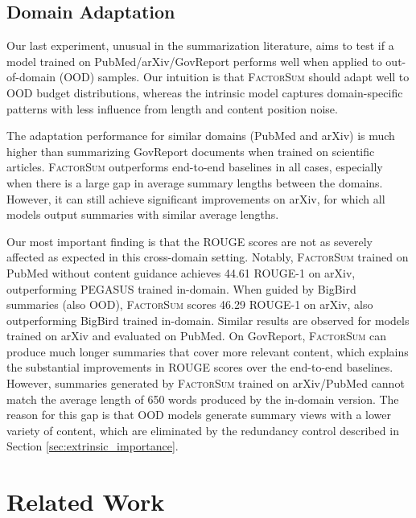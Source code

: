 \documentclass[11pt,table]{article}
\newcommand{\modelname}{FactorSum}
\begin{document}
\subsection{Domain Adaptation}
Our last experiment, unusual in the summarization literature, aims to test if a model trained on PubMed/arXiv/GovReport performs well when applied to out-of-domain (OOD) samples. Our intuition is that \textsc{\modelname} should adapt well to OOD budget distributions, whereas the intrinsic model captures domain-specific patterns with less influence from length and content position noise.

The adaptation performance for similar domains (PubMed and arXiv) is much higher than summarizing GovReport documents when trained on scientific articles. \textsc{\modelname} outperforms end-to-end baselines in all cases, especially when there is a large gap in average summary lengths between the domains. However, it can still achieve significant improvements on arXiv, for which all models output summaries with similar average lengths.

Our most important finding is that the ROUGE scores are not as severely affected as expected in this cross-domain setting. Notably, \textsc{\modelname} trained on PubMed without content guidance achieves 44.61 ROUGE-1 on arXiv, outperforming PEGASUS trained in-domain. When guided by BigBird summaries (also OOD), \textsc{\modelname} scores 46.29 ROUGE-1 on arXiv, also outperforming BigBird trained in-domain. Similar results are observed for models trained on arXiv and evaluated on PubMed.
On GovReport, \textsc{\modelname} can produce much longer summaries that cover more relevant content, which explains the substantial improvements in ROUGE scores over the end-to-end baselines. However, summaries generated by \textsc{\modelname} trained on arXiv/PubMed cannot match the average length of 650 words produced by the in-domain version. The reason for this gap is that OOD models generate summary views with a lower variety of content, which are eliminated by the redundancy control described in Section \ref{sec:extrinsic_importance}.

\section{Related Work}
\end{document}
